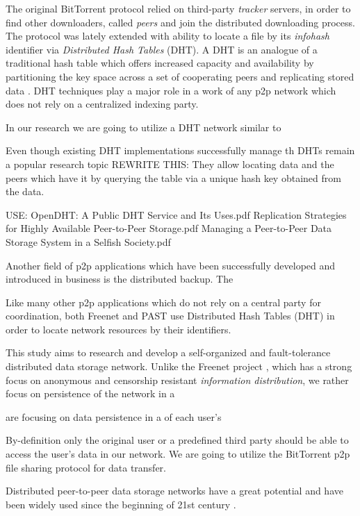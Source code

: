 The original BitTorrent protocol relied on third-party \emph{tracker}
servers, in order to find other downloaders, called \emph{peers} and
join the distributed downloading process.
The protocol was lately extended with ability to locate a file by
its \emph{infohash} identifier via \emph{Distributed Hash Tables} (DHT).
A DHT is an analogue of a traditional hash table which offers increased
capacity and availability by partitioning the key space across a set
of cooperating peers and replicating stored data \cite{opendht}.
DHT techniques play a major role in a work of any p2p network
which does not rely on a centralized indexing party.

In our research we are going to utilize a DHT network similar to

Even though existing DHT implementations successfully manage th
DHTs remain a popular research topic
REWRITE THIS: They allow locating data and the peers which have it by querying
the table via a unique hash key obtained from the data.


USE:
OpenDHT: A Public DHT Service and Its Uses.pdf
Replication Strategies for Highly Available Peer-to-Peer Storage.pdf
Managing a Peer-to-Peer Data Storage System in a Selfish Society.pdf


Another field of p2p applications which have been successfully developed
and introduced in business is the distributed backup. The

Like many other p2p applications which do not rely on a central party
for coordination, both Freenet and PAST use Distributed Hash Tables (DHT)
in order to locate network resources by their identifiers.

This study aims to research and develop a self-organized and fault-tolerance
distributed data storage network. Unlike the Freenet project \cite{freenet},
which has a strong focus on anonymous and censorship resistant \emph{information
distribution}, we rather focus on persistence of the network in a

  are focusing on data persistence in a  of each user's

By-definition only the original user
or a predefined third party should be able to access the user's data
in our network. We are going to utilize the BitTorrent \cite{bittorrent-ma}
p2p file sharing protocol for data transfer.


Distributed peer-to-peer data storage networks have a great potential and have
been widely used since the beginning of 21st century
\cite{chord-01}.
